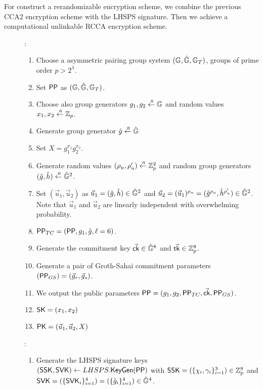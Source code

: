 For construct a rerandomizable encryption scheme, we combine the previous CCA2 encryption scheme with the LHSPS signature. Then we achieve a computational unlinkable RCCA encryption scheme.

\begin{description}
\item[]:
  \begin{enumerate}
  \item Choose a asymmetric pairing group system $(\mathbb{G}, \hat{\mathbb{G}}, \mathbb{G}_T)$, groups of prime order $p > 2^\lambda$.
  \item Set $\mathsf{PP}$ as $(\mathbb{G}, \hat{\mathbb{G}}, \mathbb{G}_T)$.
  \item Choose also group generators $g_1, g_2 \stackrel{{\scriptscriptstyle \mkern4mu R}}{\gets} \mathbb{G}$ and random values $x_1, x_2 \stackrel{{\scriptscriptstyle \mkern4mu R}}{\gets} \mathbb{Z}_p$.
  \item Generate group generator $\hat{g} \stackrel{{\scriptscriptstyle \mkern4mu R}}{\gets} \hat{\mathbb{G}}$
  \item Set $X = g_1^{x_1}g_2^{x_2}$.
  \item Generate random values $(\rho_u, \rho_u') \stackrel{{\scriptscriptstyle \mkern4mu R}}{\gets} \mathbb{Z}_p^2$ and random group generators $(\hat{g}, \hat{h}) \stackrel{{\scriptscriptstyle \mkern4mu R}}{\gets} \hat{\mathbb{G}}^2$.
  \item Set $(\vec{u}_1, \vec{u}_2)$ as $\vec{u}_1 = (\hat{g}, \hat{h}) \in \hat{\mathbb{G}}^2$ and $\vec{u}_2 = (\vec{u}_1)^{\rho_u} = (\hat{g}^{\rho_u}, \hat{h}^{\rho_u'}) \in \hat{\mathbb{G}}^2$. Note that $\vec{u}_1$ and $\vec{u}_2$ are linearly independent with overwhelming probability.
  \item $\mathsf{PP}_{TC} = (\mathsf{PP}, g_1, \hat{g}, \ell = 6)$.
  \item Generate the commitment key $\vec{\mathsf{ck}} \in \hat{\mathbb{G}}^8$ and $\vec{\mathsf{tk}} \in \mathbb{Z}_p^8$.
  \item Generate a pair of Groth-Sahai commitment parameters$(\mathsf{PP}_{GS}) = (\vec{g}_r, \vec{g}_s)$.
  \item We output the public parameters $\mathsf{PP} =  (g_1, g_2, \mathsf{PP}_{TC}, \vec{\mathsf{ck}}, \mathsf{PP}_{GS})$.
  \item $\mathsf{SK} = (x_1, x_2)$
  \item $\mathsf{PK} = (\vec{u}_1, \vec{u}_2, X)$
  \end{enumerate}
\item[]:
  \begin{enumerate}
  \item Generate the LHSPS signature keys $(\mathsf{SSK}, \mathsf{SVK}) \gets LHSPS.{\mathsf{KeyGen}}(\mathsf{PP})$ with $\mathsf{SSK} = (\{\chi_i, \gamma_i\}_{i=1}^3) \in \mathbb{Z}_p^{8}$ and $\mathsf{SVK} = (\{\mathsf{SVK}_i\}_{i=1}^4) = (\{\hat{g}_i\}_{i =1}^4) \in \hat{\mathbb{G}}^4$.

\end{enumerate}
\end{description}
